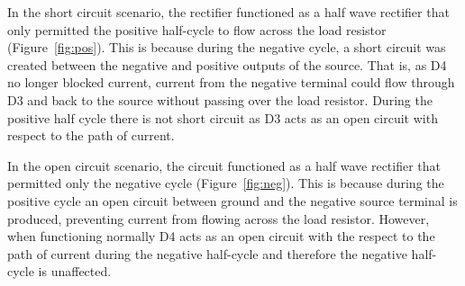 \documentclass[12pt]{article}
\begin{document}
In the short circuit scenario, the rectifier functioned as a half wave rectifier that only permitted the positive half-cycle to flow across the load resistor (Figure~\ref{fig:pos}). This is because during the negative cycle, a short circuit was created between the negative and positive outputs of the source. That is, as D4 no longer blocked current, current from the negative terminal could flow through D3 and back to the source without passing over the load resistor. During the positive half cycle there is not short circuit as D3 acts as an open circuit with respect to the path of current.

In the open circuit scenario, the circuit functioned as a half wave rectifier that permitted only the negative cycle (Figure~\ref{fig:neg}). This is because during the positive cycle an open circuit between ground and the negative source terminal is produced, preventing current from flowing across the load resistor. However, when functioning normally D4 acts as an open circuit with the respect to the path of current during the negative half-cycle and therefore the negative half-cycle is unaffected.
\end{document}
